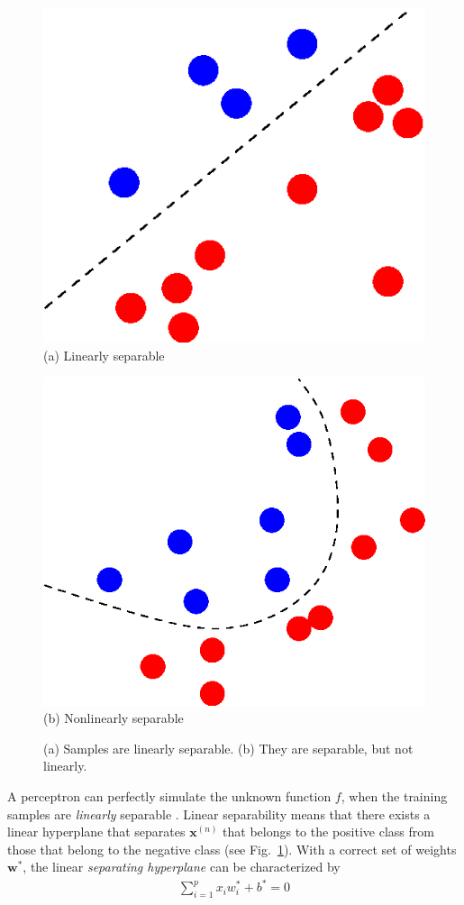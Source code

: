 \documentclass{now}
\newcommand{\vect}[1]{\mathbf{#1}}
\newcommand{\vx}[0]{\vect{x}}
\newcommand{\vw}[0]{\vect{w}}
\begin{document}
\begin{figure}[t]
    \begin{minipage}{0.48\textwidth}
        \centering
        \includegraphics[width=0.75\columnwidth]{../figures/linsep.eps}
        \\
        \small
        (a) Linearly separable
    \end{minipage}
    \begin{minipage}{0.48\textwidth}
        \centering
        \includegraphics[width=0.75\columnwidth]{../figures/nonlinsep.eps}
        \\
        \small
        (b) Nonlinearly separable
    \end{minipage}
    \caption{(a)
    Samples are linearly separable. (b) They are separable,
    but not linearly.}
    \label{fig:linsep}
\end{figure}

A perceptron can perfectly simulate the unknown function
$f$, when the training samples are \textit{linearly}
separable \citep{Minsky1969}.  Linear separability means that
there exists a linear hyperplane that separates $\vx^{(n)}$
that belongs to the positive class from those that belong to
the negative class (see Fig.~\ref{fig:linsep}). With a
correct set of weights $\vw^*$, the linear
\textit{separating hyperplane} can be characterized by
\begin{align*}
    \sum_{i=1}^p x_i w_i^* + b^* = 0
\end{align*}
\end{document}
